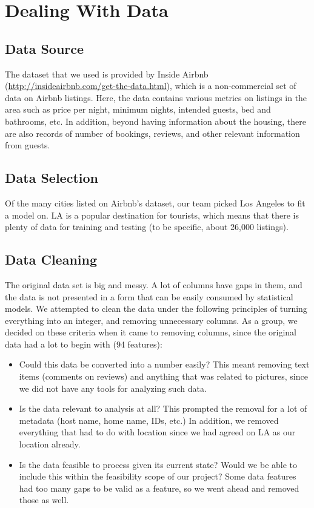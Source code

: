 \documentclass{article}
\begin{document}
\section{Dealing With Data}
\subsection{Data Source}
The dataset that we used is provided by Inside Airbnb (\url{http://insideairbnb.com/get-the-data.html}), which is a non-commercial set of data on Airbnb listings. Here, the data contains various metrics on listings in the area such as price per night, minimum nights, intended guests, bed and bathrooms, etc. In addition, beyond having information about the housing, there are also records of number of bookings, reviews, and other relevant information from guests.

\subsection{Data Selection}
Of the many cities listed on Airbnb’s dataset, our team picked Los Angeles to fit a model on. LA is a popular destination for tourists, which means that there is plenty of data for training and testing (to be specific, about 26,000 listings). 

\subsection{Data Cleaning}
The original data set is big and messy. A lot of columns have gaps in them, and the data is not presented in a form that can be easily consumed by statistical models. We attempted to clean the data under the following principles of turning everything into an integer, and removing unnecessary columns. As a group, we decided on these criteria when it came to removing columns, since the original data had a lot to begin with (94 features):

\begin{itemize}
	\item Could this data be converted into a number easily? This meant removing text items (comments on reviews) and anything that was related to pictures, since we did not have any tools for analyzing such data.
    \item Is the data relevant to analysis at all? This prompted the removal for a lot of metadata (host name, home name, IDs, etc.) In addition, we removed everything that had to do with location since we had agreed on LA as our location already.
    \item Is the data feasible to process given its current state? Would we be able to include this within the feasibility scope of our project? Some data features had too many gaps to be valid as a feature, so we went ahead and removed those as well.
\end{itemize}
\end{document}
